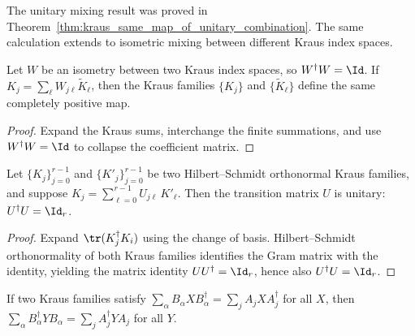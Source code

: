 The unitary mixing result was proved in
Theorem~\ref{thm:kraus_same_map_of_unitary_combination}. The same calculation
extends to isometric mixing between different Kraus index spaces.

\begin{theorem}
    \label{thm:kraus_same_map_of_isometry_combination}
    \leanok
    Let $W$ be an isometry between two Kraus index spaces, so $W^\dagger W = \Id$.
    If $K_j = \sum_\ell W_{j\ell} \widetilde K_\ell$, then the Kraus
    families $\{K_j\}$ and $\{\widetilde K_\ell\}$ define the same completely
    positive map.
\end{theorem}

\begin{proof}\leanok
    Expand the Kraus sums, interchange the finite summations, and use
    $W^\dagger W = \Id$ to collapse the coefficient matrix.
\end{proof}

\begin{theorem}\label{thm:kraus_transition_unitary_of_hs_orthonormal}
    \leanok
    Let $\{K_j\}_{j=0}^{r-1}$ and $\{K'_j\}_{j=0}^{r-1}$ be two
    Hilbert--Schmidt orthonormal Kraus families, and suppose
    $K_j = \sum_{\ell=0}^{r-1} U_{j\ell}\,K'_\ell$.
    Then the transition matrix $U$ is unitary:
    $U^\dagger U = \Id_r$.
\end{theorem}

\begin{proof}
    \leanok
    Expand $\tr(K_j^\dagger K_i)$ using the change of basis.
    Hilbert--Schmidt orthonormality of both Kraus families identifies
    the Gram matrix with the identity, yielding the matrix identity
    $U U^\dagger = \Id_r$, hence also $U^\dagger U = \Id_r$.
\end{proof}

\begin{theorem}\label{thm:kraus_dual_eq_of_map_eq}
    \leanok
    If two Kraus families satisfy
    $\sum_\alpha B_\alpha X B_\alpha^\dagger = \sum_j A_j X A_j^\dagger$
    for all $X$, then
    $\sum_\alpha B_\alpha^\dagger Y B_\alpha = \sum_j A_j^\dagger Y A_j$
    for all $Y$.
\end{theorem}

